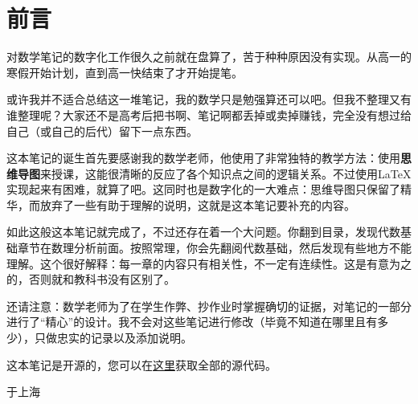 \section*{前言}
对数学笔记的数字化工作很久之前就在盘算了，苦于种种原因没有实现。从高一的寒假开始计划，直到高一快结束了才开始提笔。

或许我并不适合总结这一堆笔记，我的数学只是勉强算还可以吧。但我不整理又有谁整理呢？大家还不是高考后把书啊、笔记啊都丢掉或卖掉赚钱，完全没有想过给自己（或自己的后代）留下一点东西。

这本笔记的诞生首先要感谢我的数学老师，他使用了非常独特的教学方法：使用\textbf{思维导图}来授课，这能很清晰的反应了各个知识点之间的逻辑关系。不过使用\LaTeX{}实现起来有困难，就算了吧。这同时也是数字化的一大难点：思维导图只保留了精华，而放弃了一些有助于理解的说明，这就是这本笔记要补充的内容。

如此这般这本笔记就完成了，不过还存在着一个大问题。你翻到目录，发现代数基础章节在数理分析前面。按照常理，你会先翻阅代数基础，然后发现有些地方不能理解。这个很好解释：每一章的内容只有相关性，不一定有连续性。这是有意为之的，否则就和教科书没有区别了。

还请注意：数学老师为了在学生作弊、抄作业时掌握确切的证据，对笔记的一部分进行了“精心”的设计。我不会对这些笔记进行修改（毕竟不知道在哪里且有多少），只做忠实的记录以及添加说明。

这本笔记是开源的，您可以在{\color{blue}\href{https://github.com/jason-bowen-zheng/math-notes}{这里}}获取全部的源代码。

\begin{flushright}
	\date{2022年6月}于上海
\end{flushright}
